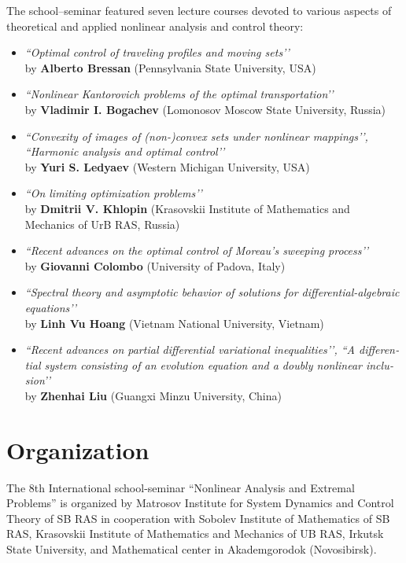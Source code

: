 \documentclass[12pt,final]{llncs}
\begin{document}
\begin{english}
\begin{itemize}
\end{itemize}
The school--seminar featured seven lecture courses devoted to various aspects of theoretical and applied nonlinear analysis and control theory:
\begin{itemize}
\item \emph{``Optimal control of traveling profiles and moving sets’’}\\ by  \textbf{Alberto Bressan} (Pennsylvania State University, USA)\smallskip
\item \emph{``Nonlinear Kantorovich problems of the optimal transportation’’}\\ by  \textbf{Vladimir I. Bogachev} (Lomonosov Moscow State University, Russia)\smallskip
\item \emph{``Convexity of images of (non-)convex sets under nonlinear mappings’’, ``Harmonic analysis and optimal control’’}\\ by \textbf{Yuri S. Ledyaev} (Western Michigan University, USA)\smallskip
\item \emph{``On limiting optimization problems’’}\\ by  \textbf{Dmitrii V. Khlopin } (Krasovskii Institute of Mathematics and Mechanics of UrB RAS, Russia)\smallskip
\item \emph{``Recent advances on the optimal control of Moreau's sweeping process’’}\\ by \textbf{Giovanni Colombo} (University of Padova, Italy)\smallskip
\item \emph{``Spectral theory and asymptotic behavior of solutions for differential-algebraic equations’’}\\ by \textbf{Linh Vu Hoang} (Vietnam National University, Vietnam)\smallskip
\item \emph{``Recent advances on partial differential variational inequalities’’, ``A differential system consisting of an evolution equation and a doubly nonlinear inclusion’’}\\ by \textbf{Zhenhai Liu} (Guangxi Minzu University, China)\smallskip
\end{itemize}

\end{english}

%
\chapter*{Organization}
\vspace{-2em}
 \begin{englisharticle}
The 8th International school-seminar ``Nonlinear Analysis and Extremal Problems'' is organized by Matrosov
Institute for System Dynamics and Control Theory of SB RAS in cooperation with
Sobolev Institute of Mathematics  of SB RAS,
  Krasovskii Institute of Mathematics and Mechanics of UB RAS,
 	Irkutsk State University, and Mathematical center in Akademgorodok (Novosibirsk).
 \end{englisharticle}
\end{document}
